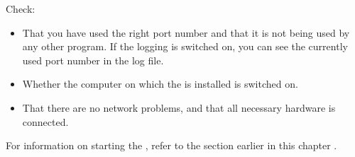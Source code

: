 % 
%
%
Check:
\begin{itemize}
\item That you have used the right port number and that it is not being used by any other program. If the \gdserver logging is switched on, you can see the currently used port number in the log file.
\item Whether the computer on which the \gdserver is installed is switched on.
\item That there are no network problems, and that all necessary hardware is connected. 
\end{itemize}

For information on starting the \gdserver, refer to the section earlier in this chapter . 










